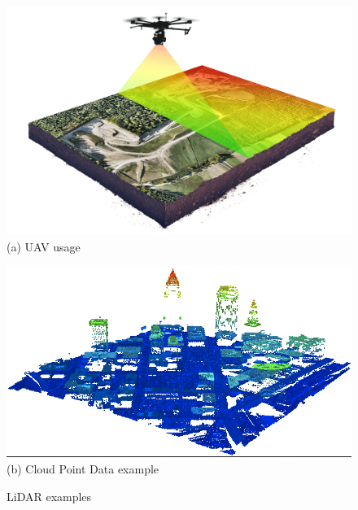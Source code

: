 \begin{figure} [H]
	\centering
		\begin{minipage}{.47\textwidth}
			\centering
			\includegraphics[width=\linewidth]{Images/Related-Work/lidar-drone-example.png}\\
			{(a) UAV usage }
		\end{minipage}%
		\hspace*{+0.8cm}
		\begin{minipage}{.47\textwidth}
			\centering
			\includegraphics[width=\linewidth]{Images/Related-Work/lidar-cloud.png}\\
			{(b) Cloud Point Data example }
		\end{minipage}
    \hfill \break
    \decoRule
	\caption[LiDAR examples]{LiDAR examples}
    \label{fig:drone-lidar}
\end{figure}


